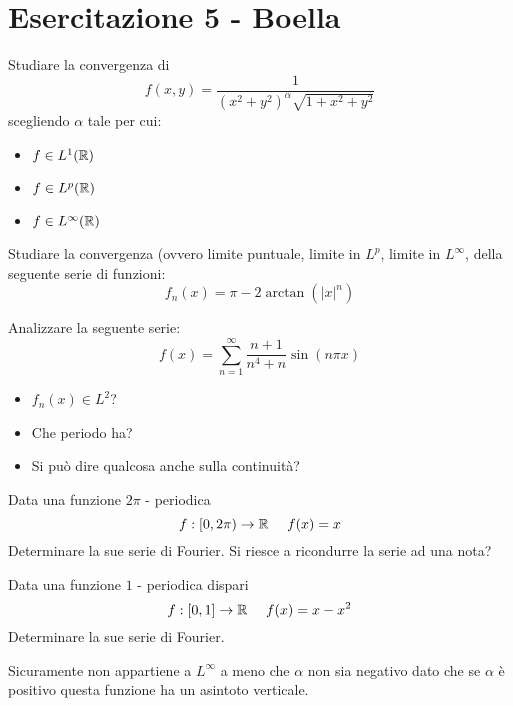 \chapter{Esercitazione 5 - Boella}
\ParteEsercizi
\Esercizio{}

Studiare la convergenza di
\begin{equation*}
f(x, y) = \frac{1}{(x^{2} + y^{2})^{\alpha}\sqrt{1 + x^{2} + y^{2}}}
\end{equation*}
scegliendo $\alpha $ tale per cui:
\begin{itemize}
\item $f\in L^{1} (\mathbb{R})$
\item $f\in L^{p} (\mathbb{R})$
\item $f\in L^{\infty} (\mathbb{R})$
\end{itemize}
\Esercizio{}

Studiare la convergenza (ovvero limite puntuale, limite in $L^{p}$, limite in $L^{\infty}$, della seguente serie di funzioni:
\begin{equation*}
f_{n} (x) = \pi - 2\arctan (|x|^{n})
\end{equation*}
\Esercizio{}

Analizzare la seguente serie:
\begin{equation*}
f(x) = \sum^{\infty}_{n = 1}\frac{n + 1}{n^{4} + n}\sin (n\pi x)
\end{equation*}
\begin{itemize}
\item $f_{n} (x)\in L^{2}$?
\item Che periodo ha?
\item Si può dire qualcosa anche sulla continuità?
\end{itemize}
\Esercizio{}

Data una funzione $2\pi $ - periodica
\begin{equation*}
f:[ 0, 2\pi)\rightarrow \RR  \ \ \ \ f(x) = x
\end{equation*}
Determinare la sue serie di Fourier. Si riesce a ricondurre la serie ad una nota?
\Esercizio{}

Data una funzione $1$ - periodica dispari
\begin{equation*}
f:[ 0, 1]\rightarrow \mathbb{R}  \ \ \ \ f(x) = x - x^{2}
\end{equation*}
Determinare la sue serie di Fourier.
\ParteSoluzioni
\Soluzione

Sicuramente non appartiene a $L^{\infty}$ a meno che $\alpha $ non sia negativo dato che se $\alpha $ è positivo questa funzione ha un asintoto verticale.

